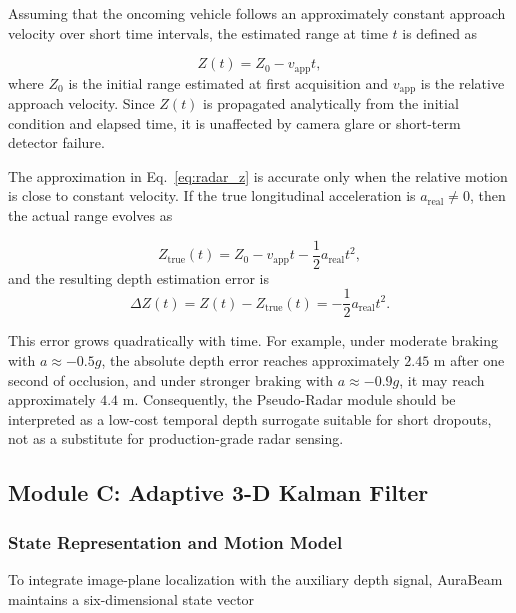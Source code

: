 \documentclass[pdflatex,sn-mathphys-num]{sn-jnl}%
\theoremstyle{thmstyleone}%
\theoremstyle{thmstyletwo}%
\theoremstyle{thmstylethree}%
\begin{document}
Assuming that the oncoming vehicle follows an approximately constant approach velocity over short time intervals, the estimated range at time $t$ is defined as

\begin{equation}
Z(t) = Z_0 - v_{\mathrm{app}} t,
\label{eq:radar_z}
\end{equation}
where $Z_0$ is the initial range estimated at first acquisition and $v_{\mathrm{app}}$ is the relative approach velocity. Since $Z(t)$ is propagated analytically from the initial condition and elapsed time, it is unaffected by camera glare or short-term detector failure.

The approximation in Eq.~\eqref{eq:radar_z} is accurate only when the relative motion is close to constant velocity. If the true longitudinal acceleration is $a_{\mathrm{real}} \neq 0$, then the actual range evolves as

\begin{equation}
Z_{\mathrm{true}}(t) = Z_0 - v_{\mathrm{app}} t - \frac{1}{2} a_{\mathrm{real}} t^2,
\label{eq:radar_true}
\end{equation}
and the resulting depth estimation error is
\begin{equation}
\Delta Z(t) = Z(t) - Z_{\mathrm{true}}(t) = -\frac{1}{2} a_{\mathrm{real}} t^2.
\label{eq:depth_error}
\end{equation}

This error grows quadratically with time. For example, under moderate braking with $a \approx -0.5g$, the absolute depth error reaches approximately $2.45$ m after one second of occlusion, and under stronger braking with $a \approx -0.9g$, it may reach approximately $4.4$ m. Consequently, the Pseudo-Radar module should be interpreted as a low-cost temporal depth surrogate suitable for short dropouts, not as a substitute for production-grade radar sensing.

\subsection{Module C: Adaptive 3-D Kalman Filter}
\label{subsec:kf_fusion}

\subsubsection{State Representation and Motion Model}

To integrate image-plane localization with the auxiliary depth signal, AuraBeam maintains a six-dimensional state vector
\end{document}
